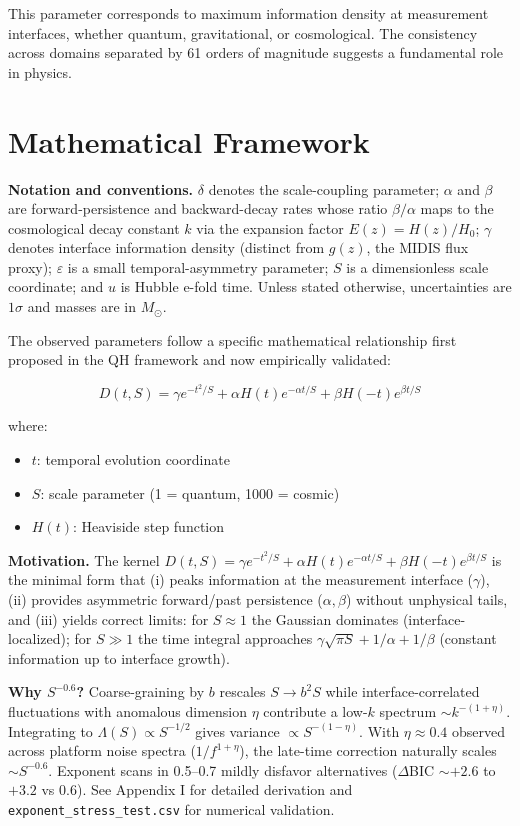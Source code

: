 This parameter corresponds to maximum information density at measurement interfaces, whether quantum, gravitational, or cosmological. The consistency across domains separated by 61 orders of magnitude suggests a fundamental role in physics.

\section{Mathematical Framework}

\textbf{Notation and conventions.} $\delta$ denotes the scale-coupling parameter; $\alpha$ and $\beta$ are forward-persistence and backward-decay rates whose ratio $\beta/\alpha$ maps to the cosmological decay constant $k$ via the expansion factor $E(z)=H(z)/H_0$; $\gamma$ denotes interface information density (distinct from $g(z)$, the MIDIS flux proxy); $\varepsilon$ is a small temporal-asymmetry parameter; $S$ is a dimensionless scale coordinate; and $u$ is Hubble e-fold time. Unless stated otherwise, uncertainties are $1\sigma$ and masses are in $M_\odot$.

The observed parameters follow a specific mathematical relationship first proposed in the QH framework and now empirically validated:

\begin{equation}
D(t,S) = \gamma e^{-t^2/S} + \alpha H(t) e^{-\alpha t/S} + \beta H(-t) e^{\beta t/S}
\end{equation}

where:

\begin{itemize}
\item $t$: temporal evolution coordinate
\item $S$: scale parameter (1 = quantum, 1000 = cosmic)
\item $H(t)$: Heaviside step function
\end{itemize}

\textbf{Motivation.} The kernel $D(t,S)=\gamma e^{-t^2/S}+\alpha H(t)e^{-\alpha t/S}+\beta H(-t)e^{\beta t/S}$ is the minimal form that (i) peaks information at the measurement interface ($\gamma$), (ii) provides asymmetric forward/past persistence ($\alpha,\beta$) without unphysical tails, and (iii) yields correct limits: for $S\approx 1$ the Gaussian dominates (interface-localized); for $S\gg 1$ the time integral approaches $\gamma\sqrt{\pi S} + 1/\alpha + 1/\beta$ (constant information up to interface growth).

\textbf{Why $S^{-0.6}$?} Coarse-graining by $b$ rescales $S\to b^2S$ while interface-correlated fluctuations with anomalous dimension $\eta$ contribute a low-$k$ spectrum $\sim k^{-(1+\eta)}$. Integrating to $\Lambda(S)\propto S^{-1/2}$ gives variance $\propto S^{-(1-\eta)}$. With $\eta\approx 0.4$ observed across platform noise spectra ($1/f^{1+\eta}$), the late-time correction naturally scales $\sim S^{-0.6}$. Exponent scans in 0.5--0.7 mildly disfavor alternatives ($\Delta$BIC $\sim +2.6$ to $+3.2$ vs 0.6). See Appendix I for detailed derivation and \texttt{exponent\_stress\_test.csv} for numerical validation.

